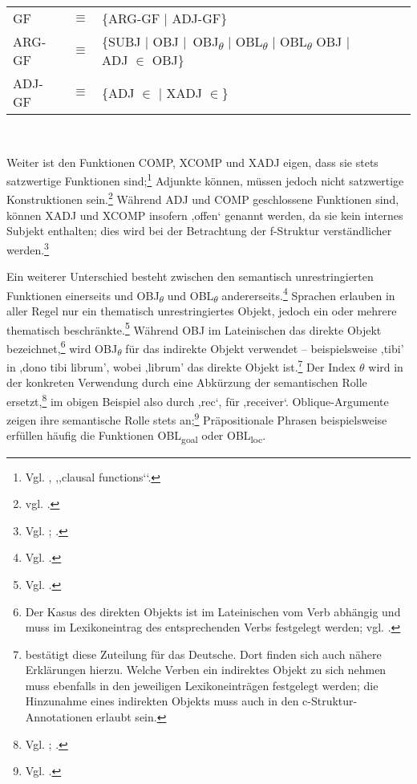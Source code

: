 \documentclass[12pt,a4paper]{article}
\begin{document}
\begin{singlespace}
\begin{tabular}{ l  l  l  c  c  c  c }
GF & $\equiv$ & \{ARG-GF $\mid$ ADJ-GF\} \\
ARG-GF & $\equiv$ & \{SUBJ $\mid$ OBJ $\mid$\ OBJ\textsubscript{$\theta$} $\mid$ OBL\textsubscript{$\theta$} $\mid$ OBL\textsubscript{$\theta$} OBJ $\mid$ ADJ $\in$ OBJ\} \\
ADJ-GF & $\equiv$ & \{ADJ $\in$ $\mid$ XADJ $\in$\} \\
\end{tabular}\\
\end{singlespace}

Weiter ist den Funktionen COMP, XCOMP und XADJ eigen, dass sie stets satzwertige Funktionen sind;\footnote{Vgl. \cite[24]{Dal}, ,,clausal functions‘‘.} Adjunkte können, müssen jedoch nicht satzwertige Konstruktionen sein.\footnote{vgl. \cite[40]{Skript}.} Während ADJ und COMP geschlossene Funktionen sind, können XADJ und XCOMP insofern ,offen‘ genannt werden, da sie kein internes Subjekt enthalten; dies wird bei der Betrachtung der f-Struktur verständlicher werden.\footnote{Vgl. \cite[10; 14; 24]{Dal}; \cite[54]{Skript}.}

Ein weiterer Unterschied besteht zwischen den semantisch unrestringierten Funktionen einerseits und OBJ\textsubscript{$\theta$} und OBL\textsubscript{$\theta$} andererseits.\footnote{Vgl. \cite[10; 15-7]{Dal}.} Sprachen erlauben in aller Regel nur ein thematisch unrestringiertes Objekt, jedoch ein oder mehrere thematisch beschränkte.\footnote{Vgl. \cite[21]{Dal}.} Während OBJ im Lateinischen das direkte Objekt bezeichnet,\footnote{Der Kasus des direkten Objekts ist im Lateinischen vom Verb abhängig und muss im Lexikoneintrag des entsprechenden Verbs festgelegt werden; vgl. \cite[30]{Skript}.} wird OBJ\textsubscript{$\theta$} für das indirekte Objekt verwendet – beispielsweise ,tibi' in ,dono tibi librum', wobei ,librum' das direkte Objekt ist.\footnote{\cite[30]{Skript} bestätigt diese Zuteilung für das Deutsche. Dort finden sich auch nähere Erklärungen hierzu. Welche Verben ein indirektes Objekt zu sich nehmen muss ebenfalls in den jeweiligen Lexikoneinträgen festgelegt werden; die Hinzunahme eines indirekten Objekts muss auch in den c-Struktur-Annotationen erlaubt sein.}  Der Index $\theta$ wird in der konkreten Verwendung durch eine Abkürzung der semantischen Rolle ersetzt,\footnote{Vgl. \cite[32]{Skript}; \cite[21]{Rohrer}.} im obigen Beispiel also durch ,rec‘, für ,receiver‘. Oblique-Argumente zeigen ihre semantische Rolle stets an;\footnote{Vgl. \cite[26]{Dal}.} Präpositionale Phrasen beispielsweise erfüllen häufig die Funktionen OBL\textsubscript{goal} oder OBL\textsubscript{loc}.
\end{document}
